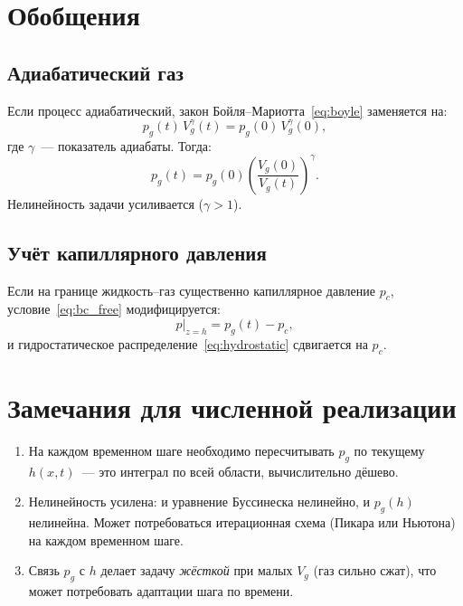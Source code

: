 \documentclass[12pt,a4paper]{article}
\begin{document}
\section{Обобщения}

\subsection{Адиабатический газ}
Если процесс адиабатический, закон Бойля--Мариотта~\eqref{eq:boyle} заменяется на:
\begin{equation}
  p_g(t)\, V_g^\gamma(t) = p_g(0)\, V_g^\gamma(0),
\end{equation}
где $\gamma$~--- показатель адиабаты. Тогда:
\begin{equation}
  p_g(t) = p_g(0) \left(\frac{V_g(0)}{V_g(t)}\right)^\gamma.
\end{equation}
Нелинейность задачи усиливается ($\gamma > 1$).

\subsection{Учёт капиллярного давления}
Если на границе жидкость--газ существенно капиллярное давление $p_c$, условие~\eqref{eq:bc_free} модифицируется:
\begin{equation}
  p\big|_{z=h} = p_g(t) - p_c,
\end{equation}
и гидростатическое распределение~\eqref{eq:hydrostatic} сдвигается на $p_c$.

\section{Замечания для численной реализации}

\begin{enumerate}[nosep]
  \item На каждом временном шаге необходимо пересчитывать $p_g$ по текущему $h(x,t)$~--- это интеграл по всей области, вычислительно дёшево.
  \item Нелинейность усилена: и уравнение Буссинеска нелинейно, и $p_g(h)$ нелинейна. Может потребоваться итерационная схема (Пикара или Ньютона) на каждом временном шаге.
  \item Связь $p_g$ с $h$ делает задачу \emph{жёсткой} при малых $V_g$ (газ сильно сжат), что может потребовать адаптации шага по времени.
\end{enumerate}
\end{document}
